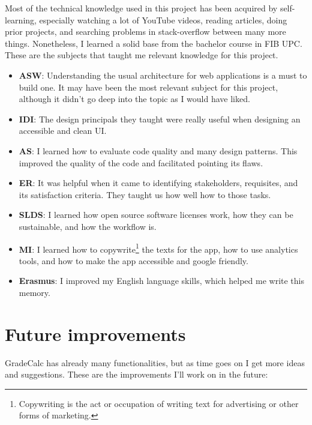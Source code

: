 Most of the technical knowledge used in this project has been acquired by self-learning, especially watching a lot of YouTube videos, reading articles, doing prior projects, and searching problems in stack-overflow between many more things. Nonetheless, I learned a solid base from the bachelor course in FIB UPC. These are the subjects that taught me relevant knowledge for this project.

\begin{itemize}
    \item \textbf{ASW}: Understanding the usual architecture for web applications is a must to build one. It may have been the most relevant subject for this project, although it didn't go deep into the topic as I would have liked.
    \item \textbf{IDI}: The design principals they taught were really useful when designing an accessible and clean UI.
    \item \textbf{AS}: I learned how to evaluate code quality and many design patterns. This improved the quality of the code and facilitated pointing its flaws.
    \item \textbf{ER}: It was helpful when it came to identifying stakeholders, requisites, and its satisfaction criteria. They taught us how well how to those tasks.
    \item \textbf{SLDS}: I learned how open source software licenses work, how they can be sustainable, and how the workflow is.
    \item \textbf{MI}: I learned how to copywrite\footnote{Copywriting is the act or occupation of writing text for advertising or other forms of marketing.} the texts for the app, how to use analytics tools, and how to make the app accessible and google friendly. 
    \item \textbf{Erasmus}: I improved my English language skills, which helped me write this memory. %
\end{itemize}



\clearpage\newpage
\section{Future improvements}

GradeCalc has already many functionalities, but as time goes on I get more ideas and suggestions. These are the improvements I'll work on in the future:

